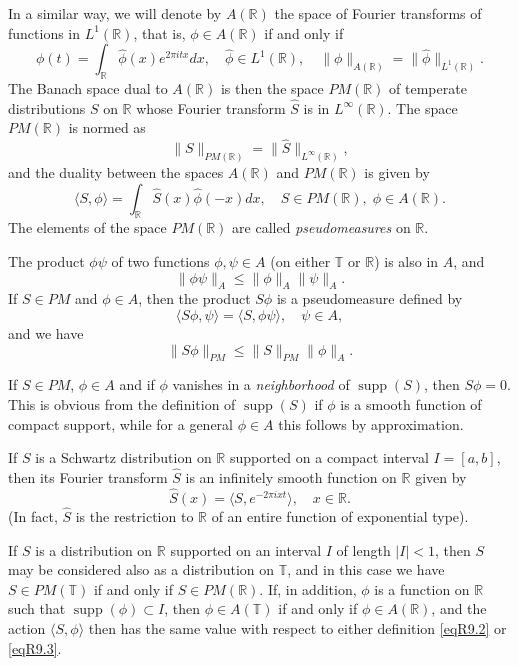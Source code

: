 \documentclass[reqno,a4paper,12pt]{amsart}
\numberwithin{equation}{section}
\numberwithin{figure}{section}
\newcommand\R{\mathbb{R}}
\newcommand\T{\mathbb{T}}
\newcommand\1{\mathds{1}}
\renewcommand\leq{\leqslant}
\newcommand\sbt{\subset}
\newcommand{\ft}[1]{\widehat{#1}}
\newcommand{\dotprod}[2]{\langle #1 , #2 \rangle}
\newcommand{\supp}{\operatorname{supp}}
\theoremstyle{plain}
\theoremstyle{definition}
\begin{document}
In a similar way, we will denote by $A(\R)$ the
space of Fourier transforms of functions in $L^1(\R)$,
that is, $\phi \in A(\R)$ if and only if
\[
\phi(t) = \int_{\R} \ft{\phi}(x) e^{2 \pi i t x} dx, \quad
\ft{\phi} \in L^1(\R),
\quad
\|\phi\|_{A(\R)} = \|\ft{\phi}\|_{L^1(\R)}.
\]
The Banach space dual to $A(\R)$ is then 
the space $PM(\R)$ 
of   temperate distributions $S$ on $\R$ whose
Fourier transform $\ft{S}$ is in $L^\infty(\R)$.
The space $PM(\R)$ is normed as
\[
\|S\|_{PM(\R)} = \|\ft{S}\|_{L^\infty(\R)},
\]
and the duality
between the spaces $A(\R)$ and $PM(\R)$
is given by
\begin{equation}
\label{eqR9.3}
\dotprod{S}{\phi} =  \int_\R \ft{S}(x)\ft{\phi}(-x)dx,
\quad S \in PM(\R), \; \phi \in A(\R).
\end{equation}
The elements of the space $PM(\R)$
are called \emph{pseudomeasures} on $\R$.

The product $\phi \psi$ of two functions $\phi, \psi \in A$
(on either $\T$ or $\R$) is also in $A$, and
\[
\|\phi \psi\|_{A} \leq \|\phi\|_{A} \|\psi\|_{A}.
\]
If $S \in PM$ and $\phi \in A$, then
the product $S\phi$ is a pseudomeasure  defined by
\[
\dotprod{S\phi}{\psi} = \dotprod{S}{\phi \psi},
\quad \psi \in A,
\]
and we have
\[
\|S\phi\|_{PM} \leq \|S\|_{PM} \|\phi\|_{A}.
\]

If $S \in PM$, $\phi \in A$ and if $\phi$ vanishes
in a \emph{neighborhood} of $\supp(S)$, then $S\phi=0$. 
This is obvious from the definition 
of $\supp(S)$ if $\phi$ is a smooth function
of compact support, while for a general $\phi \in A$ this 
 follows by approximation. 



If $S$ is a Schwartz distribution on $\R$ supported on 
a compact interval $I=[a,b]$,  then
its Fourier transform $\ft{S}$ is 
 an infinitely smooth function on $\R$ given by
\[
\ft{S}(x) = \dotprod{S}{e^{-2 \pi i x t}}, \quad x \in \R.
\]
(In fact, $\ft{S}$ is the restriction
to $\R$ of an entire function of exponential type).

If $S$ is a distribution on $\R$ supported 
on an interval $I$ of length $|I| < 1$,
then $S$ may  be considered also as a distribution on $\T$,
and in this case we have
$S \in PM(\T)$ if and only if
$S \in PM(\R)$.
If, in addition, $\phi$ is   a  function on $\R$
such that
$\supp(\phi)\sbt I$, then
$\phi \in A(\T)$ if and only if $\phi \in A(\R)$,
and the action $\dotprod{S}{\phi}$ then has the same
value with respect to either definition
\eqref{eqR9.2} or \eqref{eqR9.3}.
\end{document}
